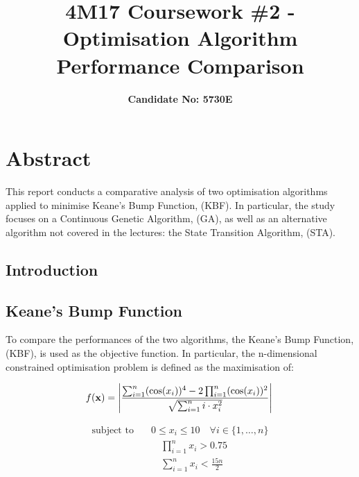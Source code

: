 \documentclass[10pt]{article}
\title{\vspace{-3cm}\textbf{4M17 Coursework \#2 - Optimisation Algorithm Performance Comparison}}
\author{\vspace{-3cm}\textbf{Candidate No: 5730E}}
\begin{document}
\maketitle
\section{Abstract}
This report conducts a comparative analysis of two optimisation algorithms applied to minimise Keane's Bump Function, (KBF). In particular, the study focuses on a Continuous Genetic Algorithm, (GA), as well as an alternative algorithm not covered in the lectures: the State Transition Algorithm, (STA).

\begin{multicols}{2}

\section{Introduction}
\subsection{Keane's Bump Function}
To compare the performances of the two algorithms, the Keane's Bump Function, (KBF), is used as the objective function. In particular, the n-dimensional constrained optimisation problem is defined as the maximisation of:

\begin{equation}
    f(\mathbf{x}) = \left| \frac{\sum_{i=1}^{n} (\cos(x_i))^4 - 2\prod_{i=1}^{n} (\cos(x_i))^2}{\sqrt{\sum_{i=1}^{n} i \cdot x_i^2}} \right| \\\vspace{1cm}
    \label{eq:KBF_cost}
\end{equation}

\begin{equation}
    \begin{aligned}
        \text{subject to} \quad & 0 \leq x_i \leq 10 \quad \forall i \in \{1, \dots, n\} \\
        & \quad \prod_{i=1}^{n} x_i > 0.75 \\
        & \quad \sum_{i=1}^{n} x_i < \frac{15n}{2}
    \end{aligned} 
    \label{eq:KBF_constraints}
\end{equation}


\end{multicols}
\end{document}

